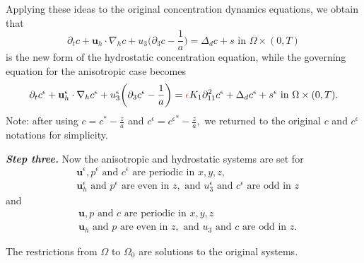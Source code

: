 \documentclass{beamer}
\begin{document}
\begin{frame}
Applying these ideas to the original concentration dynamics equations, we obtain that
%
\begin{equation} \nonumber
\partial_t c + \mathbf{u}_h \cdot \nabla_h c + u_3 \bigg ( \partial_3 c - \frac{1}{a} \bigg ) = \Delta_d c + s \text{ in } \Omega \times (0,T)
\end{equation}
%
is the new form of the hydrostatic concentration equation, while the governing equation for the anisotropic case becomes
%
\begin{equation} \nonumber
\partial_t c^\epsilon + \mathbf{u}_h^\epsilon \cdot \nabla_h c^\epsilon + u_3^\epsilon \bigg ( \partial_3 c^\epsilon - \frac{1}{a} \bigg )= \textcolor{jasper}{\epsilon} K_1 \partial_{11} ^ 2 c^\epsilon + \Delta_d c^\epsilon + s^\epsilon \text{ in } \Omega \times (0,T).
\end{equation}
%
Note: after using $c = c^* - \frac{z}{a}$ and $c^\epsilon = {c^\epsilon}^* - \frac{z}{a},$ we returned to the original $c$ and $c^\epsilon$ notations for simplicity.
\end{frame}

\begin{frame}
\textit{\textbf{Step three.}} Now the anisotropic and hydrostatic systems are set for
%
\begin{equation} \nonumber
\begin{split}
& \mathbf{u}^\epsilon, p^\epsilon \text{ and } c^\epsilon \text{ are periodic in } x,y,z, \\
& \mathbf{u}_h^\epsilon \text{ and } p^\epsilon \text{ are even in $z$}, \text{ and } u_3^\epsilon \text{ and } c^\epsilon \text{ are odd in $z$}
\end{split}
\end{equation}
%
and
%
\begin{equation} \nonumber
\begin{split}
& \mathbf{u}, p \text{ and } c \text{ are periodic in } x,y,z \\
& \mathbf{u}_h \text{ and } p \text{ are even in $z$}, \text{ and } u_3 \text{ and } c \text{ are odd in $z$}.
\end{split}
\end{equation}

The restrictions from $\Omega$ to $\Omega_0$ are solutions to the original systems.
\end{frame}
\end{document}
